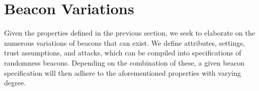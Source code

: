 \section{Beacon Variations}\label{sec:randomnessbeaconvariations}
Given the properties defined in the previous section, we seek to elaborate on the numerous variations of beacons that can exist.
We define attributes, settings, trust assumptions, and attacks, which can be compiled into specifications of randomness beacons.
Depending on the combination of these, a given beacon specification will then adhere to the aforementioned properties with varying degree.

